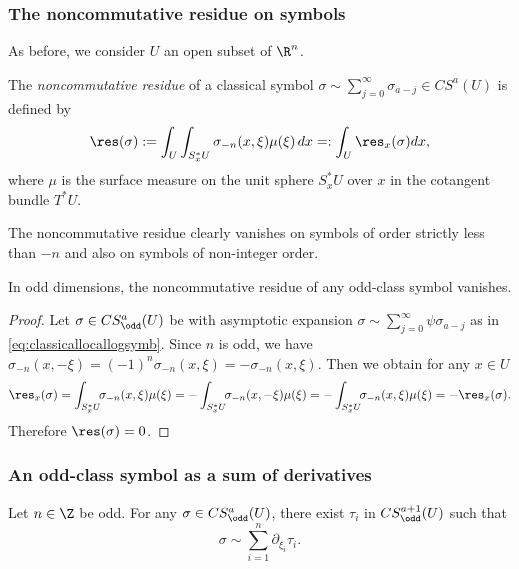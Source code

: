 \subsubsection{The noncommutative residue on symbols}

As before, we consider $U$ an open subset of $\R^n$.

\begin{definition}
The \emph{noncommutative residue} of a classical symbol $\sigma\sim\sum\limits_{j=0}^\infty\sigma_{a-j}\in CS^a(U)$ is def\/ined by
\[
\res(\sigma):=\int_U \int_{S_x^{*}U} \sigma_{-n}(x,\xi) \mu(\xi)\, dx=:\int_U \res_x(\sigma)dx,
\]
where $\mu$ is the surface measure on the unit sphere $S_x^{*}U$ over $x$ in the cotangent bundle $T^*U$.
\end{definition}
The noncommutative residue clearly vanishes on symbols of order strictly less than $-n$ and also on symbols of non-integer order.

\begin{lemma}\label{eq: nullityRES}
In odd dimensions, the noncommutative residue of any odd-class symbol vanishes.
\end{lemma}

\begin{proof}
Let $\sigma\in CS_{\odd}^a(U)$ be with asymptotic expansion $\sigma\sim\sum\limits_{j=0}^\infty\psi \sigma_{a-j}$ as in \eqref{eq:classicallocallogsymb}. Since $n$ is odd, we have $\sigma_{-n}(x,-\xi)=(-1)^{n}\sigma_{-n}(x,\xi)=-\sigma_{-n}(x,\xi)$. Then we obtain for any $x\in U$
\begin{gather*}
\res_x(\sigma)=\int_{S_x^{*}U}\!\!\sigma_{-n}(x,\xi)\mu(\xi)=-\int_{S_x^{*}U}\!\!\sigma_{-n}(x,-\xi)\mu(\xi)
=-\int_{S_x^{*}U}\!\!\sigma_{-n}(x,\xi)\mu(\xi)=-\res_x(\sigma).
\end{gather*}
Therefore $\res(\sigma)=0$.
\end{proof}

\subsubsection{An odd-class symbol as a sum of derivatives}

\begin{proposition}\label{prop:SymbolSumDerivatives}
Let $n\in\Z$ be odd. For any $\sigma\in CS_{\odd}^a(U)$, there exist $\tau_i$ in $CS_{\odd}^{a+1}(U)$ such that
\[
\sigma\sim\sum\limits_{i=1}^n\partial_{\xi_i}\tau_i.
\]
\end{proposition}

